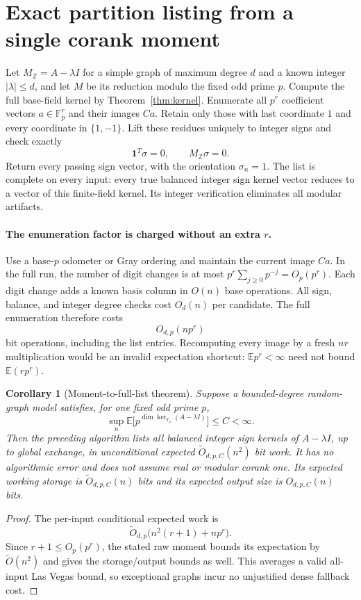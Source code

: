\documentclass[11pt]{article}
\newtheorem{corollary}[theorem]{Corollary}
\newcommand{\F}{\mathbb F}
\newcommand{\one}{\boldsymbol1}
\newcommand{\E}{\mathbb E}
\begin{document}
\section{Exact partition listing from a single corank moment}
Let $M_{\mathbb Z}=A-\lambda I$ for a simple graph of maximum degree
$d$ and a known integer $|\lambda|\le d$, and let $M$ be its reduction modulo
the fixed odd prime $p$. Compute the full base-field kernel by
Theorem~\ref{thm:kernel}. Enumerate all $p^r$ coefficient vectors
$a\in\F_p^r$ and their images $Ca$.
Retain only those with last coordinate $1$ and every coordinate in
$\{1,-1\}$. Lift these residues uniquely to integer signs and
check exactly
\[
 \one^T\sigma=0,\qquad M_{\mathbb Z}\sigma=0.
\]
Return every passing sign vector, with the orientation $\sigma_n=1$.
The list is complete on every input: every true balanced integer
sign kernel vector reduces to a vector of this finite-field kernel.
Its integer verification eliminates all modular artifacts.

\paragraph{The enumeration factor is charged without an extra $r$.}
Use a base-$p$ odometer or Gray ordering and maintain the current
image $Ca$. In the full run, the number of digit changes is at most
$p^r\sum_{j\ge0}p^{-j}=O_p(p^r)$.
Each digit change adds a known basis column in $O(n)$ base operations.
All sign, balance, and integer degree checks cost $O_d(n)$ per
candidate. The full enumeration therefore costs
\[
 O_{d,p}(n p^r)
\]
bit operations, including the list entries. Recomputing every image
by a fresh $nr$ multiplication would be an invalid expectation
shortcut: $\E p^r<\infty$ need not bound $\E(rp^r)$.

\begin{corollary}[Moment-to-full-list theorem]\label{cor:moment}
Suppose a bounded-degree random-graph model satisfies, for one fixed
odd prime $p$,
\[
 \sup_n\E\bigl[p^{\dim\ker_{\F_p}(A-\lambda I)}\bigr]\le C<\infty.
\]
Then the preceding algorithm lists all balanced integer sign kernels
of $A-\lambda I$, up to global exchange, in unconditional expected
$\widetilde O_{d,p,C}(n^2)$ bit work. It has no algorithmic error
and does not assume real or modular corank one. Its expected working
storage is $\widetilde O_{d,p,C}(n)$ bits and its expected output
size is $O_{d,p,C}(n)$ bits.
\end{corollary}
\begin{proof}
The per-input conditional expected work is
\[
 \widetilde O_{d,p}\bigl(n^2(r+1)+n p^r\bigr).
\]
Since $r+1\le O_p(p^r)$, the stated raw moment bounds its expectation
by $\widetilde O(n^2)$ and gives the storage/output bounds as well.
This averages a valid all-input Las Vegas bound, so exceptional
graphs incur no unjustified dense fallback cost.
\end{proof}
\end{document}
